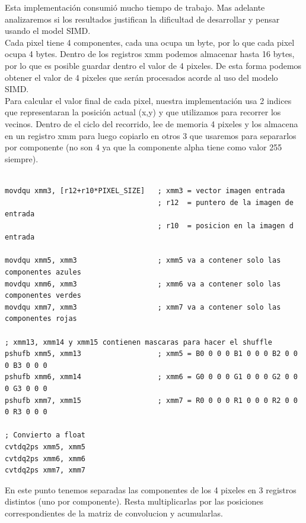 \documentclass[10pt,a4paper,spanish]{article}
\begin{document}
Esta implementación consumió mucho tiempo de trabajo. Mas adelante analizaremos si los resultados justifican la dificultad de desarrollar y pensar usando el model SIMD. \\

Cada pixel tiene 4 componentes, cada una ocupa un byte, por lo que cada pixel ocupa 4 bytes. Dentro de los registros xmm podemos almacenar hasta 16 bytes, por lo que es posible guardar dentro el valor de 4 pixeles. De esta forma podemos obtener el valor de 4 pixeles que serán procesados acorde al uso del modelo SIMD. \\

Para calcular el valor final de cada pixel, nuestra implementación usa 2 indices que representaran la posición actual (x,y) y que utilizamos para recorrer los vecinos. Dentro de el ciclo del recorrido, lee de memoria 4 pixeles y los almacena en un registro xmm para luego copiarlo en otros 3 que usaremos para separarlos por componente (no son 4 ya que la componente alpha tiene como valor 255 siempre).

\begin{codesnippet}
\begin{verbatim}
	
movdqu xmm3, [r12+r10*PIXEL_SIZE]   ; xmm3 = vector imagen entrada
                                    ; r12  = puntero de la imagen de entrada
                                    ; r10  = posicion en la imagen d entrada

movdqu xmm5, xmm3                   ; xmm5 va a contener solo las componentes azules
movdqu xmm6, xmm3                   ; xmm6 va a contener solo las componentes verdes
movdqu xmm7, xmm3                   ; xmm7 va a contener solo las componentes rojas	

; xmm13, xmm14 y xmm15 contienen mascaras para hacer el shuffle
pshufb xmm5, xmm13                  ; xmm5 = B0 0 0 0 B1 0 0 0 B2 0 0 0 B3 0 0 0
pshufb xmm6, xmm14                  ; xmm6 = G0 0 0 0 G1 0 0 0 G2 0 0 0 G3 0 0 0
pshufb xmm7, xmm15                  ; xmm7 = R0 0 0 0 R1 0 0 0 R2 0 0 0 R3 0 0 0

; Convierto a float
cvtdq2ps xmm5, xmm5
cvtdq2ps xmm6, xmm6
cvtdq2ps xmm7, xmm7

\end{verbatim}
\end{codesnippet}

En este punto tenemos separadas las componentes de los 4 pixeles en 3 registros distintos (uno por componente). Resta multiplicarlas por las posiciones correspondientes de la matriz de convolucion y acumularlas. \\
\end{document}
